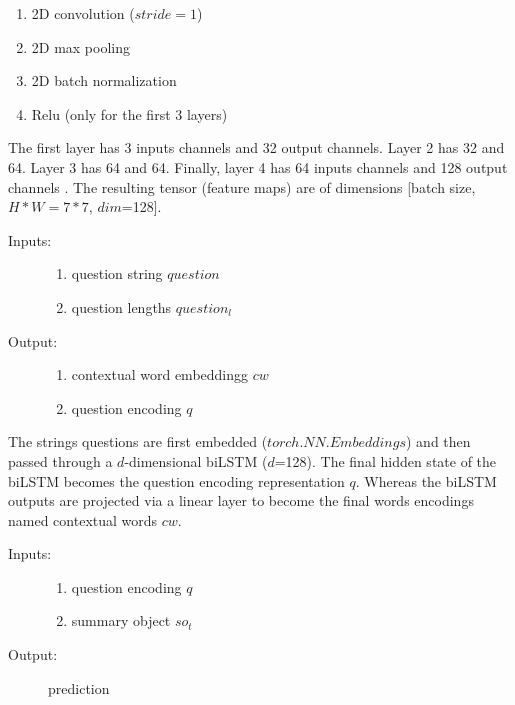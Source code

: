 \begin{enumerate}
	\item 2D convolution ($stride=1$) 
	\item 2D max pooling
	\item 2D batch normalization
	\item Relu (only for the first 3 layers)
\end{enumerate}

The first layer has 3 inputs channels and 32 output channels. Layer 2 has 32 and 64. Layer 3 has 64 and 64. Finally, layer 4 has 64 inputs channels and 128 output channels .
The resulting tensor (feature maps) are of dimensions [batch size, $H*W =7*7$, $dim$=128]. 




\begin{description}
	\item[Inputs:] 
	\begin{enumerate}
		\item question string $question$
		\item question lengths $question_l$
		
	\end{enumerate}
	
	
	\item[Output:] 
	\begin{enumerate}
		\item contextual word embeddingg $cw$
		\item question encoding $q$
		
	\end{enumerate}
	
\end{description}

The strings questions are first embedded ($torch.NN.Embeddings$) and then passed through a $d$-dimensional biLSTM ($d$=128).
The final hidden state of the biLSTM becomes the question encoding representation $q$. Whereas the biLSTM outputs are projected via a linear layer to become the final words encodings named contextual words $cw$. 


\begin{description}
	\item[Inputs:] 
	\begin{enumerate}
		\item question encoding $q$
		\item summary object $so_t$

	\end{enumerate}
	
	
	\item[Output:] 
	prediction 
\end{description}

